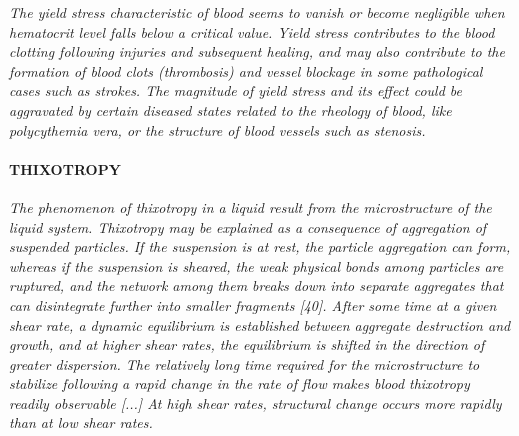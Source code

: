 \documentclass[11pt,letterpaper]{article}
\begin{document}
\textit{The yield stress characteristic of blood seems to vanish or become negligible when hematocrit level falls below a critical value. Yield stress contributes to the blood clotting following injuries and subsequent healing, and may also contribute to the formation of blood clots (thrombosis) and vessel blockage in some pathological cases such as strokes. The magnitude of yield stress and its effect could be aggravated by certain diseased states related to the rheology of blood, like polycythemia vera, or the structure of blood vessels such as stenosis.}

\paragraph{THIXOTROPY }\textit{The phenomenon of thixotropy in a liquid result from the microstructure of the liquid
system. Thixotropy may be explained as a consequence of aggregation of suspended particles. If the suspension is at rest, the particle aggregation can form, whereas if the suspension is sheared, the weak physical bonds among particles are ruptured, and the network among them breaks down into separate aggregates that can disintegrate further into smaller fragments [40]. After some time at a given shear rate, a dynamic equilibrium is established between aggregate destruction and growth, and at higher shear rates, the equilibrium is shifted in the direction of greater dispersion. The relatively long time required for the microstructure to stabilize following a rapid change in the rate of flow makes blood thixotropy readily observable [...] At high shear rates, structural change occurs more rapidly than at low shear rates.}
\end{document}
